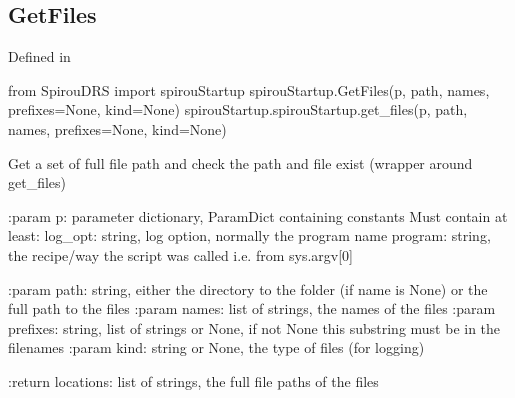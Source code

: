 \noindent\begin{minipage}{\textwidth}
\subsection{GetFiles}

Defined in \spirouStartup{}

\begin{pythonbox}
from SpirouDRS import spirouStartup
spirouStartup.GetFiles(p, path, names, prefixes=None, kind=None)
spirouStartup.spirouStartup.get_files(p, path, names, prefixes=None, kind=None)
\end{pythonbox}

\begin{pythondocstring}
  Get a set of full file path and check the path and file exist
  (wrapper around get_files)

  :param p: parameter dictionary, ParamDict containing constants
      Must contain at least:
              log_opt: string, log option, normally the program name
              program: string, the recipe/way the script was called
                       i.e. from sys.argv[0]

  :param path: string, either the directory to the folder (if name is None) or
               the full path to the files
  :param names: list of strings, the names of the files
  :param prefixes: string, list of strings or None, if not None this
                   substring must be in the filenames
  :param kind: string or None, the type of files (for logging)

  :return locations: list of strings, the full file paths of the files
\end{pythondocstring}
\end{minipage}




